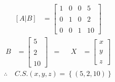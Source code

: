 \documentclass[10pt, a4paper]{article}
\begin{document}
\begin{multicols*}{2}
\begin{align*}
\end{align*}
\begin{align*}
  \left[A|B\right]&=\left[
    \begin{array}{ccc|c}
      1 & 0 & 0 & 5 \\\\
      0 & 1 & 0 & 2 \\\\
      0 & 0 & 1 & 10
    \end{array}
  \right]
\end{align*}
\begin{align*}
  B&=\left[
    \begin{array}{c}
      5\\\\
      2\\\\
      10
    \end{array}
  \right]
  &=
  &&X&=\left[
    \begin{array}{c}
      x \\\\
      y \\\\
      z 
    \end{array}
  \right]
\end{align*}
\begin{align*}
  \therefore \ &C.S. \left(x,y,z\right) = \left\{\left(5,2,10\right)\right\}
\end{align*}
\end{multicols*}
\newpage
\end{document}
